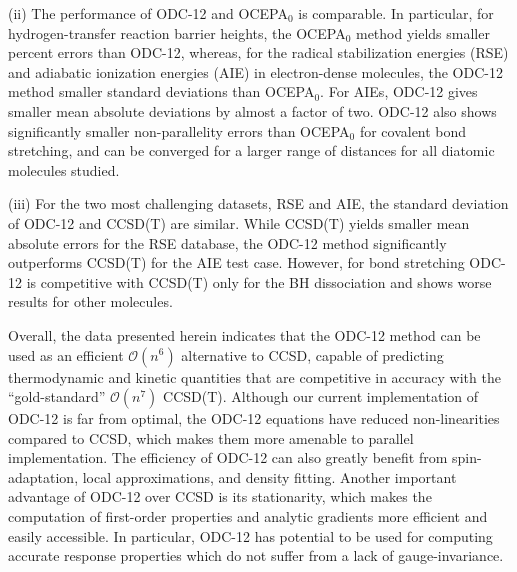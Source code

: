 (ii) The performance of ODC-12 and OCEPA$_0$ is comparable.
In particular, for hydrogen-transfer reaction barrier heights, the OCEPA$_0$
method yields smaller percent errors than ODC-12, whereas, for the radical
stabilization energies (RSE) and adiabatic ionization energies (AIE) in
electron-dense molecules, the ODC-12 method smaller standard deviations than
OCEPA$_0$.
For AIEs, ODC-12 gives smaller mean absolute deviations by almost a factor of
two.
ODC-12 also shows significantly smaller non-parallelity errors than OCEPA$_0$
for covalent bond stretching, and can be converged for a larger range of
distances for all diatomic molecules studied.

(iii) For the two most challenging datasets, RSE and AIE, the standard deviation
of ODC-12 and CCSD(T) are similar.
While CCSD(T) yields smaller mean absolute errors for the RSE database, the
ODC-12 method significantly outperforms CCSD(T) for the AIE test case.
However, for bond stretching ODC-12 is competitive with CCSD(T) only for the BH
dissociation and shows worse results for other molecules.

Overall, the data presented herein indicates that the ODC-12 method can be used
as an efficient $\mathcal{O}(n^6)$ alternative to CCSD, capable of predicting
thermodynamic and kinetic quantities that are competitive in accuracy with the
``gold-standard'' $\mathcal{O}(n^7)$ CCSD(T).
Although our current implementation of ODC-12 is far from optimal, the ODC-12
equations have reduced non-linearities compared to CCSD, which makes them more
amenable to parallel implementation.
The efficiency of ODC-12 can also greatly benefit from
spin-adaptation,\cite{Kutzelnigg:1999p2800,Kutzelnigg:2002p4787,Kutzelnigg:2010p433}
local
approximations,\cite{Werner:2003p8149,Taube:2005p837,Neese:2009p064103,Neese:2009p114108}
and density
fitting.\cite{Vahtras:1993p514,Hetzer:2000p9443,Schutz:2001p661,Werner:2003p8149}
Another important advantage of ODC-12 over CCSD is its stationarity, which makes
the computation of first-order properties and analytic gradients more efficient
and easily accessible.
In particular, ODC-12 has potential to be used for computing accurate response
properties which do not suffer from a lack of
gauge-invariance.\cite{Pedersen:1999p8318,Pedersen:2001p6983}
